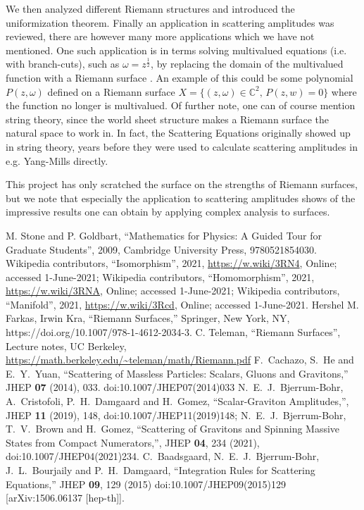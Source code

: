 \documentclass[lettersize,12pt]{article}
\begin{document}
We then analyzed different Riemann structures and introduced the uniformization theorem. Finally an application in scattering amplitudes was reviewed, there are however many more applications which we have not mentioned. One such application is in terms solving multivalued equations (i.e. with branch-cuts), such as $\omega=z^{\frac{1}{2}}$, by replacing the domain of the multivalued function with a Riemann surface \cite{Surf}. An example of this could be some polynomial $P(z,\omega)$ defined on a Riemann surface $X=\{(z,\omega)\in \mathds{C}^2,\,P(z,w)=0\}$ where the function no longer is multivalued. Of further note, one can of course mention string theory, since the world sheet structure makes a Riemann surface the natural space to work in. In fact, the Scattering Equations originally showed up in string theory, years before they were used to calculate scattering amplitudes in e.g. Yang-Mills directly.

This project has only scratched the surface on the strengths of Riemann surfaces, but we note that especially the application to scattering amplitudes shows of the impressive results one can obtain by applying complex analysis to surfaces. 
\begin{thebibliography}{99}
M. Stone and  P. Goldbart,
``Mathematics for Physics: A Guided Tour for Graduate Students'',
 2009,
Cambridge University Press, 
9780521854030.
Wikipedia contributors,
``Isomorphism'', 2021, \url{https://w.wiki/3RN4}, Online; accessed 1-June-2021;
Wikipedia contributors,
``Homomorphism'', 2021, \url{https://w.wiki/3RNA}, Online; accessed 1-June-2021;
Wikipedia contributors,
``Manifold'', 2021, \url{https://w.wiki/3Rcd}, Online; accessed 1-June-2021.
{}
Hershel M. Farkas, Irwin Kra, 
``Riemann Surfaces,'' 
Springer, New York, NY, 
https://doi.org/10.1007/978-1-4612-2034-3.
C. Teleman,
``Riemann Surfaces'',
Lecture notes, 
UC Berkeley,
\url{https://math.berkeley.edu/~teleman/math/Riemann.pdf}
F.~Cachazo, S.~He and E.~Y.~Yuan,
``Scattering of Massless Particles: Scalars, Gluons and Gravitons,''
JHEP \textbf{07} (2014), 033.
doi:10.1007/JHEP07(2014)033
N.~E.~J.~Bjerrum-Bohr, A.~Cristofoli, P.~H.~Damgaard and H.~Gomez,
``Scalar-Graviton Amplitudes,'',
JHEP \textbf{11} (2019), 148,
doi:10.1007/JHEP11(2019)148;
N.~E.~J.~Bjerrum-Bohr, T.~V.~Brown and H.~Gomez,
``Scattering of Gravitons and Spinning Massive States from Compact Numerators,'',
JHEP \textbf{04}, 234 (2021),
doi:10.1007/JHEP04(2021)234.
C.~Baadsgaard, N.~E.~J.~Bjerrum-Bohr, J.~L.~Bourjaily and P.~H.~Damgaard,
``Integration Rules for Scattering Equations,''
JHEP \textbf{09}, 129 (2015)
doi:10.1007/JHEP09(2015)129
[arXiv:1506.06137 [hep-th]].
\end{thebibliography}
\end{document}
